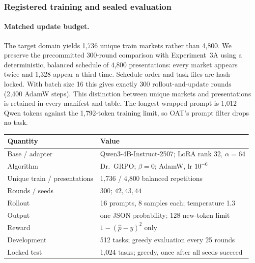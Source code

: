 \subsubsection{Registered training and sealed evaluation}

\paragraph{Matched update budget.}
The target domain yields 1,736 unique train markets rather than 4,800. We preserve
the precommitted 300-round comparison with Experiment~3A using a deterministic,
balanced schedule of 4,800 presentations: every market appears twice and 1,328
appear a third time. Schedule order and task files are hash-locked. With batch size
16 this gives exactly 300 rollout-and-update rounds (2,400 AdamW steps). This distinction between unique markets and
presentations is retained in every manifest and table. The longest wrapped prompt
is 1,012 Qwen tokens against the 1,792-token training limit, so OAT's prompt filter
drops no task.

\begin{center}
\begin{minipage}{\linewidth}
\centering
{}
\label{tab:exp3b-hparams}
\scriptsize
\begin{tabular}{p{.34\linewidth}p{.59\linewidth}}
\toprule
\textbf{Quantity} & \textbf{Value} \\
\midrule
Base / adapter & Qwen3-4B-Instruct-2507; LoRA rank 32, $\alpha=64$ \\
Algorithm & Dr.~GRPO; $\beta=0$; AdamW, lr $10^{-6}$ \\
Unique train / presentations & 1,736 / 4,800 balanced repetitions \\
Rounds / seeds & 300; $42,43,44$ \\
Rollout & 16 prompts, 8 samples each; temperature 1.3 \\
Output & one JSON probability; 128 new-token limit \\
Reward & $1-(\hat p-y)^2$ only \\
Development & 512 tasks; greedy evaluation every 25 rounds \\
Locked test & 1,024 tasks; greedy, once after all seeds succeed \\
\bottomrule
\end{tabular}
\end{minipage}
\end{center}

